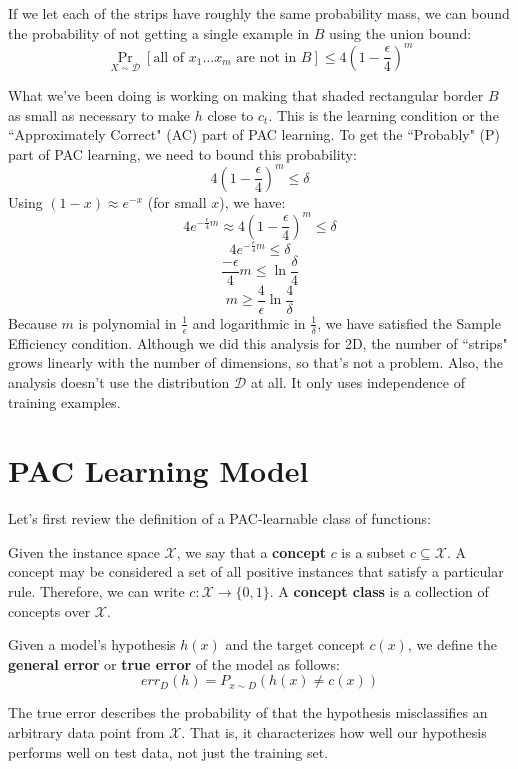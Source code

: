 \documentclass{article}
\begin{document}
If we let each of the strips have roughly the same probability mass, we can bound the probability of not getting a single example in $B$ using the union bound:
\[\Pr_{X \sim \mathcal{D}}[\text{all of } x_1 \dots x_m \text{ are not in } B] \leq 4 \left(1 - \frac{\epsilon}{4}\right)^m\]

What we've been doing is working on making that shaded rectangular border $B$ as small as necessary to make $h$ close to $c_t$. This is the learning condition or the ``Approximately Correct" (AC) part of PAC learning. To get the ``Probably" (P) part of PAC learning, we need to bound this probability:
\[4 \left(1 - \frac{\epsilon}{4}\right)^m \leq \delta\]
Using $(1 - x) \approx e^{-x}$ (for small $x$), we have:
\[4e^{-\frac{\epsilon}{4} m} \approx 4 \left(1 - \frac{\epsilon}{4}\right)^m \leq \delta\]
\[4e^{-\frac{\epsilon}{4} m} \leq \delta\]
\[\frac{-\epsilon}{4} m \leq \ln \frac{\delta}{4}\]
\[m \geq \frac{4}{\epsilon} \ln \frac{4}{\delta}\]
Because $m$ is polynomial in $\frac{1}{\epsilon}$ and logarithmic in $\frac{1}{\delta}$, we have satisfied the Sample Efficiency condition. Although we did this analysis for 2D, the number of ``strips" grows linearly with the number of dimensions, so that's not a problem. Also, the analysis doesn't use the distribution $\mathcal{D}$ at all. It only uses independence of training examples.

\section{PAC Learning Model}
Let's first review the definition of a PAC-learnable class of functions:

Given the instance space $\mathcal{X}$, we say that a \textbf{concept}
$c$ is a subset $c \subseteq \mathcal{X}$. A concept may be considered a
set of all positive instances that satisfy a particular rule. Therefore,
we can write $c : \mathcal{X} \rightarrow \{0, 1\}$. A
\textbf{concept class} is a collection of concepts over $\mathcal{X}$.

Given a model's hypothesis $h(x)$ and the target concept $c(x)$, we
define the \textbf{general error} or \textbf{true error} of the model as
follows:
$$err_D(h) = P_{x\sim D}(h(x) \neq c(x))$$

The true error describes the probability of that the hypothesis
misclassifies an arbitrary data point from $\mathcal{X}$. That is, it
characterizes how well our hypothesis performs well on test data, not
just the training set.
\end{document}

